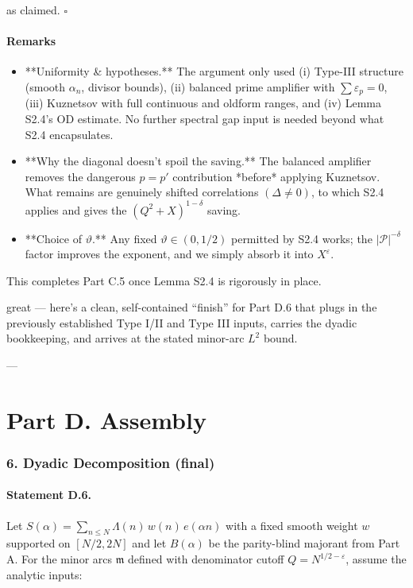 \documentclass[11pt]{article}
\theoremstyle{definition}
\theoremstyle{remark}
\begin{document}
as claimed. $\square$

\subsection*{Remarks}

\begin{itemize}
\item **Uniformity \& hypotheses.** The argument only used (i) Type-III structure (smooth $\alpha_n$, divisor bounds), (ii) balanced prime amplifier with $\sum \varepsilon_p=0$, (iii) Kuznetsov with full continuous and oldform ranges, and (iv) Lemma S2.4’s OD estimate. No further spectral gap input is needed beyond what S2.4 encapsulates.

\item **Why the diagonal doesn’t spoil the saving.** The balanced amplifier removes the dangerous $p=p'$ contribution *before* applying Kuznetsov. What remains are genuinely shifted correlations $(\Delta\neq 0)$, to which S2.4 applies and gives the $(Q^2+X)^{1-\delta}$ saving.

\item **Choice of $\vartheta$.** Any fixed $\vartheta\in(0,1/2)$ permitted by S2.4 works; the $|\mathcal P|^{-\delta}$ factor improves the exponent, and we simply absorb it into $X^{\varepsilon}$.
\end{itemize}

This completes Part C.5 once Lemma S2.4 is rigorously in place.

great — here’s a clean, self-contained “finish” for Part D.6 that plugs in the previously established Type I/II and Type III inputs, carries the dyadic bookkeeping, and arrives at the stated minor-arc $L^2$ bound.

---

\part*{Part D. Assembly}

\section*{6. Dyadic Decomposition (final)}

\subsection*{Statement D.6.}

Let $S(\alpha)=\sum_{n\le N}\Lambda(n)\,w(n)\,e(\alpha n)$ with a fixed smooth weight $w$ supported on $[N/2,2N]$ and let $B(\alpha)$ be the parity-blind majorant from Part A. For the minor arcs $\mathfrak m$ defined with denominator cutoff $Q=N^{1/2-\varepsilon}$, assume the analytic inputs:
\end{document}
